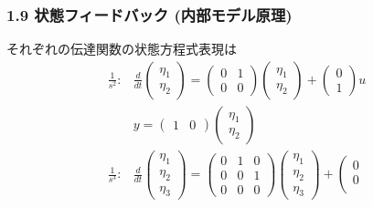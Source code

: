 \documentclass[10pt]{beamer}
\begin{document}
\begin{frame}[t]
\frametitle{1.9 状態フィードバック (内部モデル原理)}
 
それぞれの伝達関数の状態方程式表現は
\begin{align}
\frac{1}{s^2}: &  
 \frac{d}{dt}
  \left(\begin{array}{c}
         \eta_1 \\
   \eta_2
  \end{array}\right)
  =
  \left(\begin{array}{cc}
         0 & 1 \\
   0 & 0
  \end{array}\right)
  \left(\begin{array}{c}
         \eta_1 \\
   \eta_2
  \end{array}\right)
  +
  \left(\begin{array}{c}
         0 \\
   1
  \end{array}\right)
  u
  \nonumber \\ &  
  y =
  \left(\begin{array}{cc}
         1 & 0
  \end{array}\right)
  \left(\begin{array}{c}
         \eta_1 \\
   \eta_2
  \end{array}\right)
\\
\frac{1}{s^3}: &   
 \frac{d}{dt}
  \left(\begin{array}{c}
         \eta_1 \\
         \eta_2 \\
   \eta_3
  \end{array}\right)
  =
  \left(\begin{array}{ccc}
         0 & 1 & 0\\
   0 & 0 & 1\\
   0 & 0 & 0
  \end{array}\right)
  \left(\begin{array}{c}
         \eta_1 \\
         \eta_2 \\
   \eta_3
  \end{array}\right)
  +
  \left(\begin{array}{c}
         0 \\
         0 \\

\end{array}
\end{align}
\end{frame}
\end{document}
